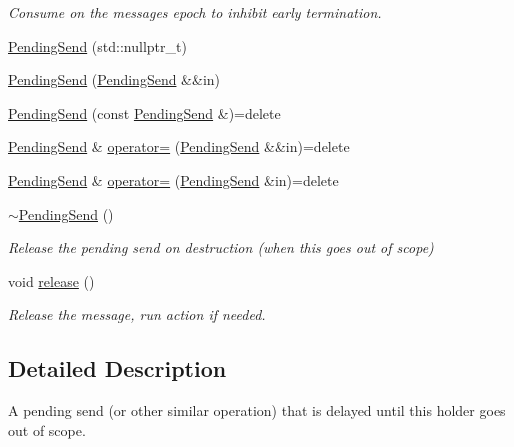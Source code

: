 \begin{DoxyCompactItemize}
\begin{DoxyCompactList}\small\item\em Consume on the messages epoch to inhibit early termination. \end{DoxyCompactList}\item 
\hyperlink{structvt_1_1messaging_1_1_pending_send_a129a9c509eacf26111013105affe5931}{Pending\+Send} (std\+::nullptr\+\_\+t)
\item 
\hyperlink{structvt_1_1messaging_1_1_pending_send_a20551a473781d22c7ccfb6664d88e0ef}{Pending\+Send} (\hyperlink{structvt_1_1messaging_1_1_pending_send}{Pending\+Send} \&\&in)
\item 
\hyperlink{structvt_1_1messaging_1_1_pending_send_a951912c336cf3cdaf91f8ccde13092af}{Pending\+Send} (const \hyperlink{structvt_1_1messaging_1_1_pending_send}{Pending\+Send} \&)=delete
\item 
\hyperlink{structvt_1_1messaging_1_1_pending_send}{Pending\+Send} \& \hyperlink{structvt_1_1messaging_1_1_pending_send_aecef2d10d22564d142b9de52a57d81c8}{operator=} (\hyperlink{structvt_1_1messaging_1_1_pending_send}{Pending\+Send} \&\&in)=delete
\item 
\hyperlink{structvt_1_1messaging_1_1_pending_send}{Pending\+Send} \& \hyperlink{structvt_1_1messaging_1_1_pending_send_addfa1d51e3b8f272b5e711867e893bca}{operator=} (\hyperlink{structvt_1_1messaging_1_1_pending_send}{Pending\+Send} \&in)=delete
\item 
\hyperlink{structvt_1_1messaging_1_1_pending_send_ade803ff2903a92eaf62b6e330593871b}{$\sim$\+Pending\+Send} ()
\begin{DoxyCompactList}\small\item\em Release the pending send on destruction (when this goes out of scope) \end{DoxyCompactList}\item 
void \hyperlink{structvt_1_1messaging_1_1_pending_send_ad4b41412f953dcd22b3e3020a812f757}{release} ()
\begin{DoxyCompactList}\small\item\em Release the message, run action if needed. \end{DoxyCompactList}\end{DoxyCompactItemize}


\subsection{Detailed Description}
A pending send (or other similar operation) that is delayed until this holder goes out of scope. 

